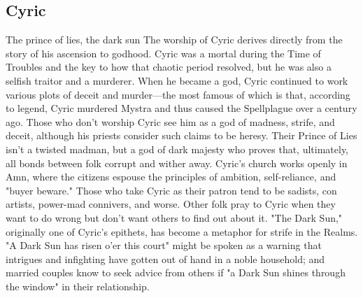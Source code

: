 \documentclass[10pt,a4paper,twoside,twocolumn,openany,bg=print,nodeprecatedcode]{dndbook}
\begin{document}
\subsection{Cyric}
The prince of lies, the dark sun
The worship of Cyric derives directly from the story of his ascension to godhood. Cyric was a mortal during the Time of Troubles and the key to how that chaotic period resolved, but he was also a selfish traitor and a murderer. When he became a god, Cyric continued to work various plots of deceit and murder—the most famous of which is that, according to legend, Cyric murdered Mystra and thus caused the Spellplague over a century ago.
Those who don't worship Cyric see him as a god of madness, strife, and deceit, although his priests consider such claims to be heresy. Their Prince of Lies isn't a twisted madman, but a god of dark majesty who proves that, ultimately, all bonds between folk corrupt and wither away.
Cyric's church works openly in Amn, where the citizens espouse the principles of ambition, self-reliance, and "buyer beware." Those who take Cyric as their patron tend to be sadists, con artists, power-mad connivers, and worse. Other folk pray to Cyric when they want to do wrong but don't want others to find out about it.
"The Dark Sun," originally one of Cyric's epithets, has become a metaphor for strife in the Realms. "A Dark Sun has risen o'er this court" might be spoken as a warning that intrigues and infighting have gotten out of hand in a noble household; and married couples know to seek advice from others if "a Dark Sun shines through the window" in their relationship.
\end{document}
